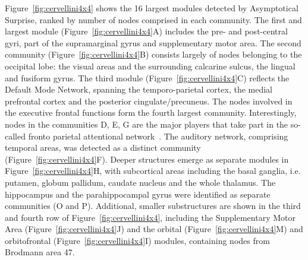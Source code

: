 Figure~\ref{fig:cervellini4x4} shows the 16 largest modules detected by Asymptotical Surprise, ranked by number of nodes comprised in each community. 
The first and largest module (Figure~\ref{fig:cervellini4x4}A) includes the pre- and post-central gyri, part of the supramarginal gyrus and supplementary motor area.
The second community (Figure~\ref{fig:cervellini4x4}B) consists largely of nodes belonging to the occipital lobe: the visual areas and the surrounding calcarine sulcus, the lingual and fusiform gyrus.
The third module (Figure~\ref{fig:cervellini4x4}C) reflects the Default Mode Network, spanning the temporo-parietal cortex, the medial prefrontal cortex and the posterior cingulate/precuneus.
The nodes involved in the executive frontal functions form the fourth largest community.
Interestingly, nodes in the communities D, E, G are the major players that take part in the so-called fronto parietal attentional network~\cite{markett2014}.
The auditory network, comprising temporal areas, was detected as a distinct community (Figure~\ref{fig:cervellini4x4}F).
Deeper structures emerge as separate modules in Figure~\ref{fig:cervellini4x4}H, with subcortical areas including the basal ganglia, i.e. putamen, globum pallidum, caudate nucleus and the whole thalamus.
The hippocampus and the parahippocampal gyrus were identified as separate communities (O and P).
Additional, smaller substructures are shown in the third and fourth row of Figure~\ref{fig:cervellini4x4}, including the Supplementary Motor Area (Figure~\ref{fig:cervellini4x4}J) and the orbital (Figure~\ref{fig:cervellini4x4}M) and orbitofrontal (Figure~\ref{fig:cervellini4x4}I) modules, containing nodes from Brodmann area 47.

